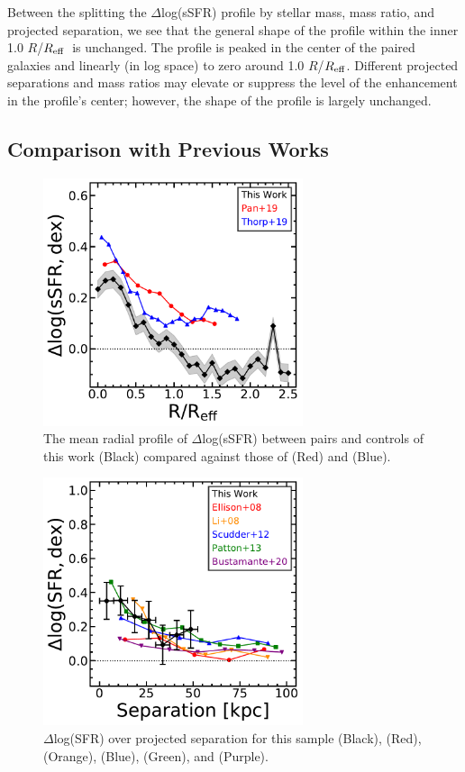 \documentclass[iop,revtex4,twocolumn,apj,numberedappendix,appendixfloats]{emulateapj}
\newcommand{\reff}{$R_{\rm eff}$}
\begin{document}
Between the splitting the $\Delta$log(sSFR) profile by stellar mass, mass ratio, and projected separation, we see that the general shape of the profile within the inner 1.0 $R$/\reff\ is unchanged. The profile is peaked in the center of the paired galaxies and linearly (in log space) to zero around 1.0 $R$/\reff. Different projected separations and mass ratios may elevate or suppress the level of the enhancement in the profile's center; however, the shape of the profile is largely unchanged.

\subsection{Comparison with Previous Works}

\begin{figure}
\centering
\includegraphics[width=3in]{fig/prof_comp.pdf}
\caption[]{The mean radial profile of $\Delta$log(sSFR) between pairs and controls of this work (Black) compared against those of \citet{Pan:2019} (Red) and \citet{Thorp:2019} (Blue).}
\label{fig:prof_comp}
\end{figure}

\begin{figure}
\centering
\includegraphics[width=3in]{fig/nuc_sep.pdf}
\caption[]{$\Delta$log(SFR) over projected separation for this sample (Black), \citet{Ellison:2008} (Red), \citet{Li:2008} (Orange), \citet{Scudder:2012} (Blue), \citet{Patton:2013} (Green), and \citet{Bustamante:2020} (Purple).  }
\label{fig:nuc_sep}
\end{figure}
\end{document}
